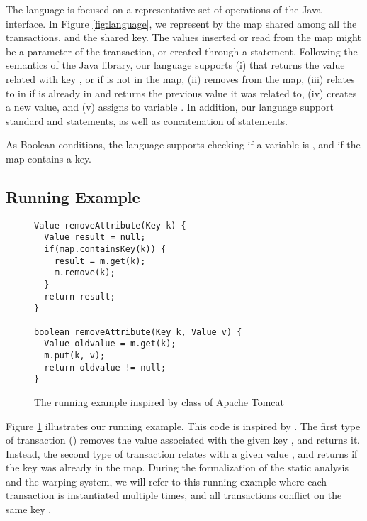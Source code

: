The language is focused on a representative set  of operations of the Java  interface. In Figure \ref{fig:language}, we represent by  the map shared among all the transactions, and  the shared key. The values inserted or read from the map might be a parameter of the transaction, or created through a  statement. Following the semantics of the Java library, our language supports (i)  that returns the value  related with key , or  if  is not in the map, (ii)  removes  from the map, (iii)  relates  to  in  if  is already in  and returns the previous value it was related to, (iv)  creates a new value, and (v)  assigns  to variable . In addition, our language support standard  and  statements, as well as concatenation of statements.

As Boolean conditions, the language supports checking if a variable is , and if the map contains a key.

\subsection{Running Example}

\begin{figure}
\begin{lstlisting}
Value removeAttribute(Key k) {
  Value result = null;
  if(map.containsKey(k)) {
    result = m.get(k);
    m.remove(k);
  }
  return result;
}

boolean removeAttribute(Key k, Value v) {
  Value oldvalue = m.get(k);
  m.put(k, v);
  return oldvalue != null;
}
\end{lstlisting}
\caption{The running example inspired by class  of Apache Tomcat}
\label{lst:runningexamplestaticanalysis}
\end{figure}

Figure \ref{lst:runningexamplestaticanalysis} illustrates our running example. This code is inspired by . The first type of transaction () removes the value associated with the given key , and returns it. Instead, the second type of transaction relates  with a given value , and returns  if the key was already in the map. During the formalization of the static analysis and the warping system, we will refer to this running example where each transaction is instantiated multiple times, and all transactions conflict on the same key .